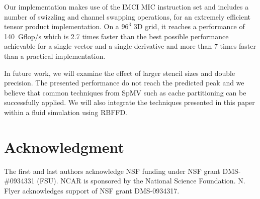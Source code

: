 \documentclass[10pt,conference,compsocconf]{IEEEtran}
\begin{document}
Our implementation makes use of the IMCI MIC instruction set and
includes a number of swizzling and channel swapping operations, for an
extremely efficient tensor product implementation. On a $96^3$ 3D
grid, it reaches a performance of 140~Gflop/s which is 2.7 times
faster than the best possible performance achievable for a single
vector and a single derivative and more than 7 times faster than a
practical implementation.

In future work, we will examine the effect of larger stencil sizes and
double precision. The presented performance do not reach the predicted
peak and we believe that common techniques from SpMV such as cache
partitioning can be successfully applied. We will also integrate the
techniques presented in this paper within a fluid simulation using
RBFFD.

\section*{Acknowledgment}
The first and last authors acknowledge NSF funding under NSF grant
DMS-\#0934331 (FSU). NCAR is sponsored by the National Science
Foundation. N. Flyer acknowledges support of NSF grant DMS-0934317.



\end{document}

